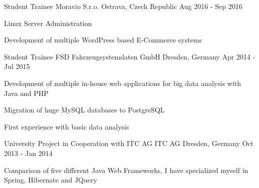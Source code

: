 \begin{cventries}
	\cventry
	{Student Trainee} %
	{Moravio S.r.o.} %
	{Ostrava, Czech Republic} %
	{Aug 2016 - Sep 2016} %
	{
		\begin{cvitems} %
			\item {Linux Server Administration}
			\item {Development of multiple WordPress based E-Commerce systems}
		\end{cvitems}
	}

	\cventry
	{Student Trainee} %
	{FSD Fahrzeugsystemdaten GmbH} %
	{Dresden, Germany} %
	{Apr 2014 - Jul 2015} %
	{
		\begin{cvitems} %
			\item {Development of multiple in-house web applications for big data analysis with Java and PHP}
			\item{Migration of huge MySQL databases to PostgreSQL}
			\item{First experience with basic data analysis}
		\end{cvitems}
	}

	\cventry
	{University Project in Cooperation with ITC AG} %
	{ITC AG} %
	{Dresden, Germany} %
	{Oct 2013 - Jan 2014} %
	{
		\begin{cvitems} %
			\item {Comparison of five different Java Web Frameworks, I have specialized myself in Spring, Hibernate and JQuery}
		\end{cvitems}
	}

\end{cventries}

